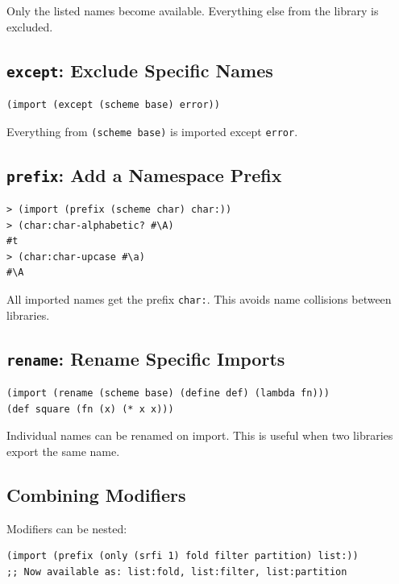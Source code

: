 Only the listed names become available. Everything else from the library is excluded.

\subsection{\texttt{except}: Exclude Specific Names}

\begin{lstlisting}
(import (except (scheme base) error))
\end{lstlisting}

Everything from \texttt{(scheme base)} is imported except \texttt{error}.

\subsection{\texttt{prefix}: Add a Namespace Prefix}

\begin{lstlisting}[style=repl]
> (import (prefix (scheme char) char:))
> (char:char-alphabetic? #\A)
#t
> (char:char-upcase #\a)
#\A
\end{lstlisting}

All imported names get the prefix \texttt{char:}. This avoids name collisions between libraries.

\subsection{\texttt{rename}: Rename Specific Imports}

\begin{lstlisting}
(import (rename (scheme base) (define def) (lambda fn)))
(def square (fn (x) (* x x)))
\end{lstlisting}

Individual names can be renamed on import. This is useful when two libraries export the same name.

\subsection{Combining Modifiers}

Modifiers can be nested:

\begin{lstlisting}
(import (prefix (only (srfi 1) fold filter partition) list:))
;; Now available as: list:fold, list:filter, list:partition
\end{lstlisting}

